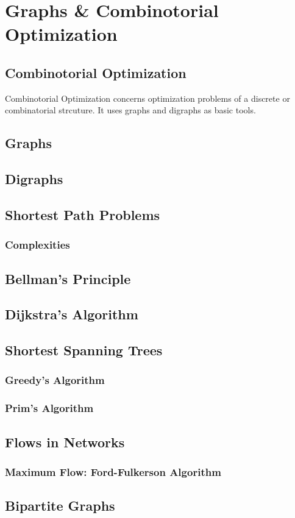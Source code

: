 \chapter{Graphs \& Combinotorial Optimization}
\section{Combinotorial Optimization} 
Combinotorial Optimization concerns optimization problems of a discrete or combinatorial strcuture. It uses graphs and digraphs as basic tools.
\section{Graphs}

\section{Digraphs}
\section{Shortest Path Problems}
\subsection{Complexities}
\section{Bellman's Principle}
\section{Dijkstra's Algorithm}
\section{Shortest Spanning Trees}
\subsection{Greedy's Algorithm}
\subsection{Prim's Algorithm}
\section{Flows in Networks}
\subsection{Maximum Flow: Ford-Fulkerson Algorithm}
\section{Bipartite Graphs}
